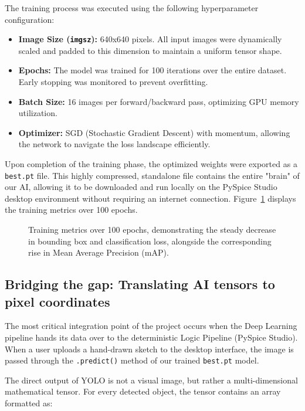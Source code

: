 \documentclass[12pt]{article}
\begin{document}
The training process was executed using the following hyperparameter configuration:
\begin{itemize}
    \item \textbf{Image Size (\texttt{imgsz}):} 640x640 pixels. All input images were dynamically scaled and padded to this dimension to maintain a uniform tensor shape.
    \item \textbf{Epochs:} The model was trained for 100 iterations over the entire dataset. Early stopping was monitored to prevent overfitting.
    \item \textbf{Batch Size:} 16 images per forward/backward pass, optimizing GPU memory utilization.
    \item \textbf{Optimizer:} SGD (Stochastic Gradient Descent) with momentum, allowing the network to navigate the loss landscape efficiently.
\end{itemize}
Upon completion of the training phase, the optimized weights were exported as a \texttt{best.pt} file. This highly compressed, standalone file contains the entire "brain" of our AI, allowing it to be downloaded and run locally on the PySpice Studio desktop environment without requiring an internet connection. Figure~\ref{fig:training_results} displays the training metrics over 100 epochs.

\begin{figure}[H]
    \centering
    \caption{Training metrics over 100 epochs, demonstrating the steady decrease in bounding box and classification loss, alongside the corresponding rise in Mean Average Precision (mAP).}
    \label{fig:training_results}
\end{figure}

\subsection{Bridging the gap: Translating AI tensors to pixel coordinates}

The most critical integration point of the project occurs when the Deep Learning pipeline hands its data over to the deterministic Logic Pipeline (PySpice Studio). When a user uploads a hand-drawn sketch to the desktop interface, the image is passed through the \texttt{.predict()} method of our trained \texttt{best.pt} model.

The direct output of YOLO is not a visual image, but rather a multi-dimensional mathematical tensor. For every detected object, the tensor contains an array formatted as:
\begin{equation}
    [\text{Class\_ID}, \text{Confidence\_Score}, x_{center}, y_{center}, \text{width}, \text{height}]
\end{equation}
\end{document}
